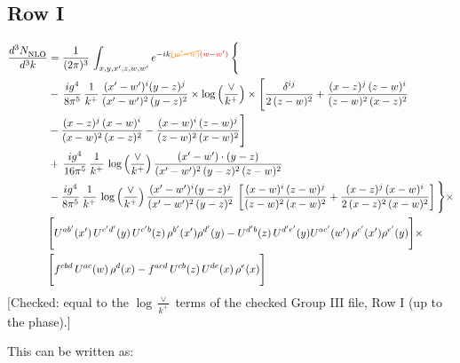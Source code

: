 \documentclass[9pt]{article}
\numberwithin{equation}{section}
\begin{document}
\subsection{Row I}
\begin{align}
     \frac{d^{3}N_{\rm NLO}^{\rm}}{d^{3}k}  & =   \frac{1}{(2\pi)^{3}}\, \int_{x,y,x',z,w,w^{\prime}} e^{-ik{\color{orange}\cancel{(w^{\prime}-w)}}{\color{red}(w-w^{\prime})}}\, \Bigg\{\notag \\
& -\,\frac{ig^{4}}{8\pi^{5}}\,\frac{1}{k^{+}}\,\frac{(x'-w')^{i}(y-z)^{j}}{(x'-w')^{2}\,(y-z)^{2}}\times \log{\left(\frac{\vee}{k^{+}}\right)}\times \Bigg[\frac{\delta^{ij}}{2\,(z-w)^{2}}+\frac{(x-z)^{j}\,(z-w)^{i}}{(z-w)^{2}\,(x-z)^{2}}\notag \\ & -\frac{(x-z)^{j}\,(x-w)^{i}}{(x-w)^{2}\,(x-z)^{2}}-\frac{(x-w)^{i}\,(z-w)^{j}}{(z-w)^{2}\,(x-w)^{2}}\Bigg] \notag \\
& +\,\frac{ig^{4}}{16\pi^{5}}\,\frac{1}{k^{+}}\,\log{\left(\frac{\vee}{k^{+}}\right)}\, \frac{(x'-w')\cdot (y-z)}{(x'-w')^{2}\,(y-z)^{2}\,(z-w)^{2}} \notag \\
& -\frac{ig^{4}}{8\pi^{5}}\,\frac{1}{k^{+}}\,\log{\left(\frac{\vee}{k^{+}}\right)}\,\frac{(x'-w')^{i}(y-z)^{j}}{(x'-w')^{2}\,(y-z)^{2}}\,\left[\frac{(x-w)^{i}\,(z-w)^{j}}{(z-w)^{2}\,(x-w)^{2}}+\frac{(x-z)^{j}\,(x-w)^{i}}{2\,(x-z)^{2}\, (x-w)^{2}}\right]\Bigg\}\times \notag \\ &  \Bigg[U^{ab'}(x')\,U^{c'd'}(y)\,U^{c'b}(z)\,\rho^{b'}(x')\rho^{d'}(y)-U^{d'b}(z)\,U^{d'e'}(y)U^{ac'}(w')\,\rho^{c'}(x')\rho^{e'}(y)\Bigg]\times\notag \\ & \Bigg[f^{cbd}\,U^{ac}(w)\,\rho^{d}(x)-f^{acd}\, U^{cb}(z)\,U^{de}(x)\,\rho^{e}(x)\Bigg]
\end{align} {\color{red}[Checked: equal to the $\log\frac{\vee}{k^{+}}$ terms of the checked Group III file, Row I (up to the phase).]}\par\noindent 
This can be written as: 
\end{document}
